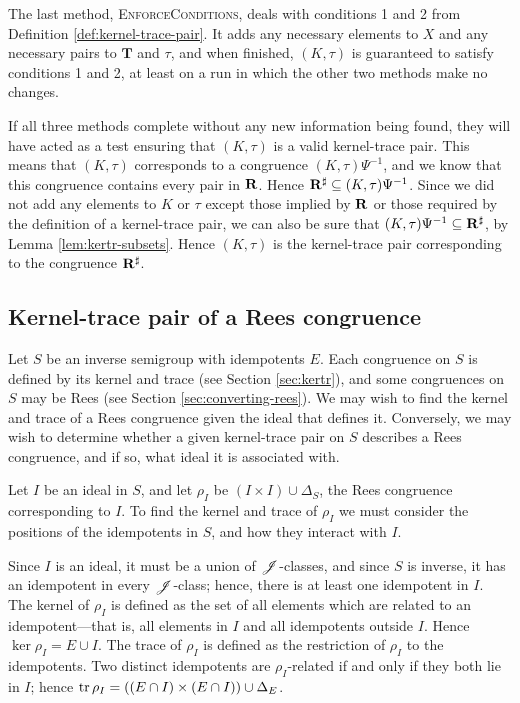 The last method, \textsc{EnforceConditions}, deals with conditions 1 and 2 from
Definition \ref{def:kernel-trace-pair}.  It adds any necessary elements to $X$
and any necessary pairs to $\mathbf{T}$ and $\tau$, and when finished,
$(K,\tau)$ is guaranteed to satisfy conditions 1 and 2, at least on a run in
which the other two methods make no changes.

If all three methods complete without any new information being found, they will
have acted as a test ensuring that $(K, \tau)$ is a valid kernel-trace pair.
This means that $(K, \tau)$ corresponds to a congruence $(K,\tau)\Psi^{-1}$, and
we know that this congruence contains every pair in $\mathbf{R}$.  Hence
$\mathbf{R}^\sharp \subseteq (K,\tau)\Psi^{-1}$.  Since we did not add any
elements to $K$ or $\tau$ except those implied by $\mathbf{R}$ or those required
by the definition of a kernel-trace pair, we can also be sure that
$(K, \tau)\Psi^{-1} \subseteq \mathbf{R}^\sharp$, by Lemma
\ref{lem:kertr-subsets}.  Hence $(K, \tau)$ is the kernel-trace pair
corresponding to the congruence $\mathbf{R}^\sharp$.

\subsection{Kernel-trace pair of a Rees congruence}
\label{sec:rees-to-kertr}
Let $S$ be an inverse semigroup with idempotents $E$.  Each congruence on $S$ is
defined by its kernel and trace (see Section \ref{sec:kertr}), and some
congruences on $S$ may be Rees (see Section \ref{sec:converting-rees}).  We may wish
to find the kernel and trace of a Rees congruence given the ideal that defines
it.  Conversely, we may wish to determine whether a given kernel-trace pair on
$S$ describes a Rees congruence, and if so, what ideal it is associated with.

Let $I$ be an ideal in $S$, and let $\rho_I$ be $(I \times I) \cup \Delta_S$,
the Rees congruence corresponding to $I$.  To find the kernel and trace of
$\rho_I$ we must consider the positions of the idempotents in $S$, and how they
interact with $I$.

Since $I$ is an ideal, it must be a union of $\mathrel{\mathscr{J}}$-classes, and since $S$ is
inverse, it has an idempotent in every $\mathrel{\mathscr{J}}$-class; hence, there is at least one
idempotent in $I$.  The kernel of $\rho_I$ is defined as the set of all elements
which are related to an idempotent---that is, all elements in $I$ and all
idempotents outside $I$.  Hence $\ker \rho_I = E \cup I$.  The trace of $\rho_I$
is defined as the restriction of $\rho_I$ to the idempotents.  Two distinct
idempotents are $\rho_I$-related if and only if they both lie in $I$; hence
$\operatorname{tr} \rho_I = ((E \cap I) \times (E \cap I)) \cup \Delta_E$.

